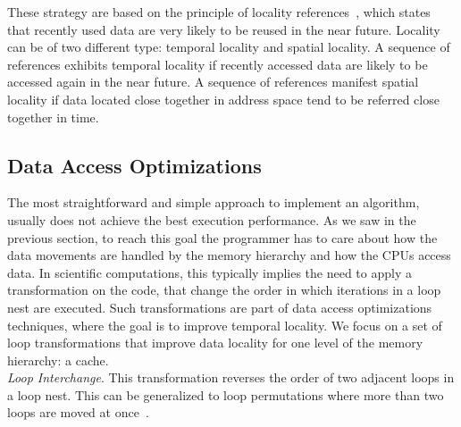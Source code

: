These strategy are based on the principle of locality references~\cite{Hennessy-Patterson}, which states that recently used data are very likely to be reused in the near future. Locality can be of two different type: temporal locality and spatial locality. A sequence of references exhibits temporal locality if recently accessed data are likely to be accessed again in the near future. A sequence of references manifest spatial locality if data located close together in address space tend to be referred close together in time.

\subsection{Data Access Optimizations}
The most straightforward and simple approach to implement an algorithm, usually does not achieve the best execution performance. As we saw in the previous section, to reach this goal the programmer has to care about how the data movements are handled by the memory hierarchy and how the CPUs access data. In scientific computations, this typically implies the need to apply a transformation on the code, that change the order in which iterations in a loop nest are executed. Such transformations are part of data access optimizations techniques, where the goal is to improve temporal locality. We focus on a set of loop transformations that improve data locality for one level of the memory hierarchy: a cache.
\\

\noindent \textit{Loop Interchange}. This transformation reverses the order of two adjacent loops in a loop nest. This can be generalized to loop permutations where more than two loops are moved at once~\citep{Kennedy:2001:OCM:502981,Wolfe:1995:HPC:572937}.

